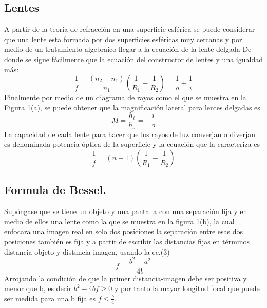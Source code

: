 \documentclass[DIV=calc, paper=a4, fontsize=10pt]{scrartcl}
\begin{document}
\subsection*{\textcolor{carmine}{Lentes}} 
A partir de la teoría de refracción en una superficie esférica \cite{Manual} se puede considerar que una lente esta formada por dos superficies esféricas muy cercanas y por medio de un tratamiento algebraico llegar a la ecuación  de la lente delgada \cite{book} De donde se sigue fácilmente que  la ecuación del constructor de lentes y una igualdad más:  
\begin{equation}
    \frac{1}{f}=\frac{(n_{2}-n_{1})}{n_{1}}\left(\frac{1}{R_{1}}-\frac{1}{R_{2}}\right)=\frac{1}{o}+\frac{1}{i}
\end{equation}
Finalmente por medio de un diagrama de rayos como el que se muestra en la Figura 1(a), se puede obtener que la magnificación lateral para lentes delgadas es \cite{book}
\begin{equation}
    M=\frac{h_{i}}{h_{o}}=-\frac{i}{o}
\end{equation}
La capacidad de cada lente para hacer que los rayos de luz converjan o diverjan es denominada potencia óptica de la superficie y la ecuación que la caracteriza es \cite{book}
\begin{equation}
    \frac{1}{f}=(n-1)\left(\frac{1}{R_{1}}-\frac{1}{R_{2}}\right)
\end{equation}
\subsection*{\textcolor{carmine}{Formula de Bessel.}}
Supóngase que se tiene un objeto y una pantalla con una separación fija y en medio de ellos una lente como la que se muestra en la figura 1(b), la cual enfocara una imagen real en solo dos posiciones la separación entre esas dos posiciones también es fija y a partir de escribir las distancias fijas en términos distancia-objeto y distancia-imagen, usando la ec.(3) \cite{article}
\begin{equation}
    f=\frac{b^{2}-a^{2}}{4b}
\end{equation}
Arrojando la condición de que la primer distancia-imagen debe ser positiva y menor que b, es decir $b^{2}-4bf\geq 0$ y por tanto la mayor longitud focal que puede ser medida para una b fija es $f\leq\frac{b}{4}$\cite{article}.\\
\end{document}
